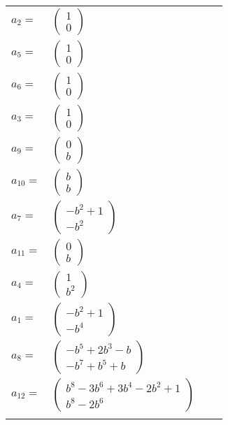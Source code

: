 \documentclass[1p]{elsarticle_modified}
\theoremstyle{definition}
\begin{document}
\begin{tabular}{m{7pt} m{180pt} m{7pt} m{180pt} }
\flushright $a_{2}=$&$\begin{pmatrix}1\\0\end{pmatrix}$ \\
\flushright $a_{5}=$&$\begin{pmatrix}1\\0\end{pmatrix}$ \\
\flushright $a_{6}=$&$\begin{pmatrix}1\\0\end{pmatrix}$ \\
\flushright $a_{3}=$&$\begin{pmatrix}1\\0\end{pmatrix}$ \\
\flushright $a_{9}=$&$\begin{pmatrix}0\\b\end{pmatrix}$ \\
\flushright $a_{10}=$&$\begin{pmatrix}b\\b\end{pmatrix}$ \\
\flushright $a_{7}=$&$\begin{pmatrix}- b^2+1\\- b^2\end{pmatrix}$ \\
\flushright $a_{11}=$&$\begin{pmatrix}0\\b\end{pmatrix}$ \\
\flushright $a_{4}=$&$\begin{pmatrix}1\\b^2\end{pmatrix}$ \\
\flushright $a_{1}=$&$\begin{pmatrix}- b^2+1\\- b^4\end{pmatrix}$ \\
\flushright $a_{8}=$&$\begin{pmatrix}- b^5+2 b^3- b\\- b^7+b^5+b\end{pmatrix}$ \\
\flushright $a_{12}=$&$\begin{pmatrix}b^8-3 b^6+3 b^4-2 b^2+1\\b^8-2 b^6\end{pmatrix}$\\&\end{tabular}
\end{document}
